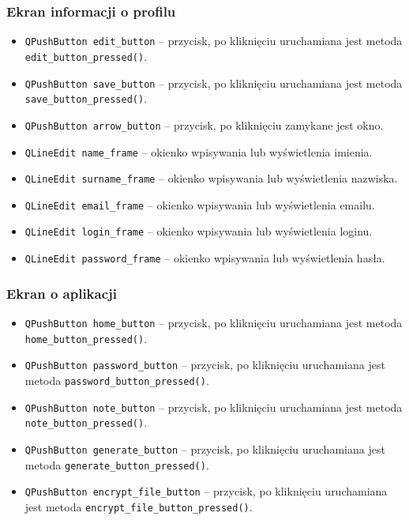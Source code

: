 \documentclass[a4paper]{article}
\newcommand{\prog}{\texttt}
\begin{document}
\subsubsection{Ekran informacji o profilu}
\begin{itemize}
    \item \prog{QPushButton edit\_button} -- przycisk, po kliknięciu uruchamiana jest metoda \prog{edit\_button\_pressed()}.
    \item \prog{QPushButton save\_button} -- przycisk, po kliknięciu uruchamiana jest metoda \prog{save\_button\_pressed()}.
    \item \prog{QPushButton arrow\_button} -- przycisk, po kliknięciu zamykane jest okno.
    \item \prog{QLineEdit name\_frame} -- okienko wpisywania lub wyświetlenia imienia.
    \item \prog{QLineEdit surname\_frame} -- okienko wpisywania lub wyświetlenia nazwiska.
    \item \prog{QLineEdit email\_frame} -- okienko wpisywania lub wyświetlenia emailu.
    \item \prog{QLineEdit login\_frame} -- okienko wpisywania lub wyświetlenia loginu.
    \item \prog{QLineEdit password\_frame} -- okienko wpisywania lub wyświetlenia hasła.
\end{itemize}

\subsubsection{Ekran o aplikacji}
\begin{itemize}
    \item \prog{QPushButton home\_button} -- przycisk, po kliknięciu uruchamiana jest metoda \prog{home\_button\_pressed()}.
    \item \prog{QPushButton password\_button} -- przycisk, po kliknięciu uruchamiana jest metoda \prog{password\_button\_pressed()}.
    \item \prog{QPushButton note\_button} -- przycisk, po kliknięciu uruchamiana jest metoda \prog{note\_button\_pressed()}.
    \item \prog{QPushButton generate\_button} -- przycisk, po kliknięciu uruchamiana jest metoda \prog{generate\_button\_pressed()}.
    \item \prog{QPushButton encrypt\_file\_button} -- przycisk, po kliknięciu uruchamiana jest metoda \prog{encrypt\_file\_button\_pressed()}.
\end{itemize}
\end{document}
